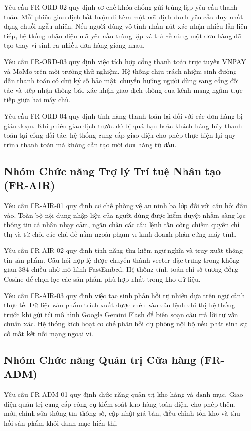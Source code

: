Yêu cầu FR-ORD-02 quy định cơ chế khóa chống gửi trùng lặp yêu cầu thanh toán. Mỗi phiên giao dịch bắt buộc đi kèm một mã định danh yêu cầu duy nhất dạng chuỗi ngẫu nhiên. Nếu người dùng vô tình nhấn nút xác nhận nhiều lần liên tiếp, hệ thống nhận diện mã yêu cầu trùng lặp và trả về cùng một đơn hàng đã tạo thay vì sinh ra nhiều đơn hàng giống nhau.

Yêu cầu FR-ORD-03 quy định việc tích hợp cổng thanh toán trực tuyến VNPAY và MoMo trên môi trường thử nghiệm. Hệ thống chịu trách nhiệm sinh đường dẫn thanh toán có chữ ký số bảo mật, chuyển hướng người dùng sang cổng đối tác và tiếp nhận thông báo xác nhận giao dịch thông qua kênh mạng ngầm trực tiếp giữa hai máy chủ.

Yêu cầu FR-ORD-04 quy định tính năng thanh toán lại đối với các đơn hàng bị gián đoạn. Khi phiên giao dịch trước đó bị quá hạn hoặc khách hàng hủy thanh toán tại cổng đối tác, hệ thống cung cấp giao diện cho phép thực hiện lại quy trình thanh toán mà không cần tạo mới đơn hàng từ đầu.

\subsection{Nhóm Chức năng Trợ lý Trí tuệ Nhân tạo (FR-AIR)}
Yêu cầu FR-AIR-01 quy định cơ chế phòng vệ an ninh ba lớp đối với câu hỏi đầu vào. Toàn bộ nội dung nhập liệu của người dùng được kiểm duyệt nhằm sàng lọc thông tin cá nhân nhạy cảm, ngăn chặn các câu lệnh tấn công chiếm quyền chỉ thị và từ chối các chủ đề nằm ngoài phạm vi kinh doanh phần cứng máy tính.

Yêu cầu FR-AIR-02 quy định tính năng tìm kiếm ngữ nghĩa và truy xuất thông tin sản phẩm. Câu hỏi hợp lệ được chuyển thành vector đặc trưng trong không gian 384 chiều nhờ mô hình FastEmbed. Hệ thống tính toán chỉ số tương đồng Cosine để chọn lọc các sản phẩm phù hợp nhất trong kho dữ liệu.

Yêu cầu FR-AIR-03 quy định việc tạo sinh phản hồi tự nhiên dựa trên ngữ cảnh thực tế. Dữ liệu sản phẩm trích xuất được chèn vào câu lệnh chỉ thị hệ thống trước khi gửi tới mô hình Google Gemini Flash để biên soạn câu trả lời tư vấn chuẩn xác. Hệ thống kích hoạt cơ chế phản hồi dự phòng nội bộ nếu phát sinh sự cố mất kết nối mạng ngoại vi.

\subsection{Nhóm Chức năng Quản trị Cửa hàng (FR-ADM)}
Yêu cầu FR-ADM-01 quy định chức năng quản trị kho hàng và danh mục. Giao diện quản trị cung cấp công cụ kiểm soát kho hàng toàn diện, cho phép thêm mới, chỉnh sửa thông tin thông số, cập nhật giá bán, điều chỉnh tồn kho và thu hồi sản phẩm khỏi danh mục hiển thị.

